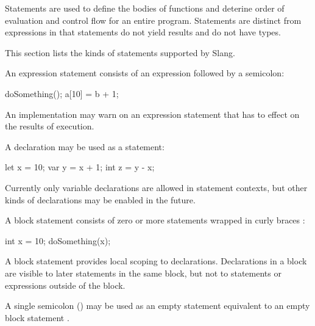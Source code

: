
Statements are used to define the bodies of functions and deterine order of evaluation and control flow for an entire program.
Statements are distinct from expressions in that statements do not yield results and do not have types.

This section lists the kinds of statements supported by Slang.


An expression statement consists of an expression followed by a semicolon:

\begin{codeblock}
doSomething();
a[10] = b + 1;
\end{codeblock}

An implementation may warn on an expression statement that has to effect on the results of execution.


A declaration may be used as a statement:

\begin{codeblock}
let x = 10;
var y = x + 1;
int z = y - x;
\end{codeblock}

\begin{Note}
Currently only variable declarations are allowed in statement contexts, but other kinds of declarations may be enabled in the future.
\end{Note}


A block statement consists of zero or more statements wrapped in curly braces \Char{\{}\Char{\}}:

\begin{codeblock}
{
	int x = 10;
	doSomething(x);
}
\end{codeblock}

A block statement provides local scoping to declarations.
Declarations in a block are visible to later statements in the same block, but not to statements or expressions outside of the block.


A single semicolon (\Char{;}) may be used as an empty statement equivalent to an empty block statement \Char{\{}\Char{\}}.




